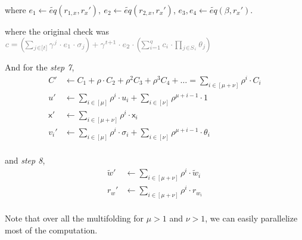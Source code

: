 \documentclass{article}
\theoremstyle{definition}
\begin{document}
where
$e_1 \leftarrow \widetilde{eq}(r_{1,x}, r_x'),~ e_2 \leftarrow \widetilde{eq}(r_{2,x}, r_x')$, $e_3, e_4 \leftarrow \widetilde{eq}(\beta, r_x')$.

\vspace{0.5cm}


where the original check was\\
$\textcolor{gray}{c = \left(\sum_{j \in [t]} \gamma^j \cdot e_1 \cdot \sigma_j \right) + \gamma^{t+1} \cdot e_2 \cdot \left( \sum_{i=1}^q c_i \cdot \prod_{j \in S_i} \theta_j \right)}$


\vspace{0.5cm}

And for the \emph{step 7},
\begin{align*}
	C' &\leftarrow C_1 + \rho \cdot C_2 + \rho^2 C_3 + \rho^3 C_4 + \ldots = \sum_{i \in [\mu + \nu]} \rho^i \cdot C_i \\
	u' &\leftarrow \sum_{i \in [\mu]} \rho^i \cdot u_i + \sum_{i \in [\nu]} \rho^{\mu + i-1} \cdot 1\\
	\mathsf{x}' &\leftarrow \sum_{i \in [\mu+\nu]} \rho^i \cdot \mathsf{x}_i\\
	v_i' &\leftarrow \sum_{i \in [\mu]} \rho^i \cdot \sigma_i + \sum_{i \in [\nu]} \rho^{\mu + i-1} \cdot \theta_i\\
\end{align*}

and \emph{step 8},
\begin{align*}
	\widetilde{w}' &\leftarrow \sum_{i \in [\mu+\nu]} \rho^i\cdot \widetilde{w}_i\\
	r_w' &\leftarrow \sum_{i \in [\mu+\nu]} \rho^i \cdot r_{w_i}\\
\end{align*}


Note that over all the multifolding for $\mu >1$ and $\nu>1$, we can easily parallelize most of the computation.
\end{document}
